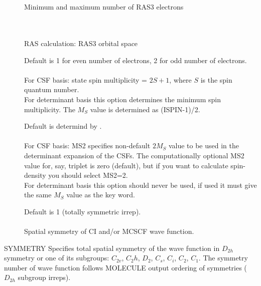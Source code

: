 \begin{description}
\item[] \ \\
    \\
   Minimum and maximum number of RAS3 electrons

\item[] \ \\
    \\
   RAS calculation: RAS3 orbital space

\item[]
  Default is 1 for even number of electrons, 2 for odd number of electrons. \\
  \\
  For CSF basis: state spin multiplicity = $2S + 1$,
  where $S$ is the spin quantum number. \\
  For determinant basis this option determines the minimum spin
  multiplicity.  The $M_S$ value is determined as (ISPIN-1)/2.

\item[]
  Default is determind by . \\
  \\
  For CSF basis: MS2 specifies non-default $2 M_S$ value to be used in the determinant expansion of the CSFs.
  The computationally optional MS2 value for, say, triplet is zero (default), but if you want to calculate
  spin-density you should select MS2=2.\\
  For determinant basis this option should never be used, if used it must give the
  same $M_S$ value as the  key word.

\item[]
  Default is 1 (totally symmetric irrep).\\
   \\
  Spatial symmetry of CI and/or MCSCF wave function.

\end{description}


\noindent SYMMETRY   Specifies total spatial symmetry of the wave
function in $D_{2h}$ symmetry or one of its subgroups: $C_{2v}$, $C_2h$,
$D_2$, $C_s$, $C_i$, $C_2$, $C_1$. The  symmetry number of wave
function follows MOLECULE output ordering of symmetries ($D_{2h}$
subgroup irreps).

